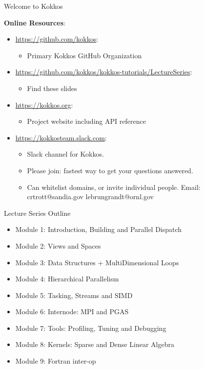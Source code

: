 \begin{frame}{Welcome to Kokkos}

\textbf{Online Resources}:

\begin{itemize}
	\item \url{https://github.com/kokkos}: 
		\begin{itemize}
			\item Primary Kokkos GitHub Organization
		\end{itemize}
	\item \url{https://github.com/kokkos/kokkos-tutorials/LectureSeries}: 
		\begin{itemize}
			\item{Find these slides}
		\end{itemize}
	\item \url{https://kokkos.org}: 
		\begin{itemize}
			\item Project website including API reference
		\end{itemize}
	\item \url{https://kokkosteam.slack.com}: 
		\begin{itemize}
			\item Slack channel for Kokkos.
			\item Please join: fastest way to get your questions answered.
			\item Can whitelist domains, or invite individual people. Email: crtrott@sandia.gov lebrungrandt@ornl.gov
		\end{itemize}
\end{itemize}

\end{frame}



\begin{frame}{Lecture Series Outline}

\begin{itemize}
	\item Module 1: Introduction, Building and Parallel Dispatch
	\item Module 2: Views and Spaces
	\item Module 3: Data Structures + MultiDimensional Loops
	\item Module 4: Hierarchical Parallelism
	\item Module 5: Tasking, Streams and SIMD
	\item Module 6: Internode: MPI and PGAS
	\item Module 7: Tools: Profiling, Tuning and Debugging
	\item Module 8: Kernels: Sparse and Dense Linear Algebra
    \item Module 9: Fortran inter-op
\end{itemize}
\end{frame}

